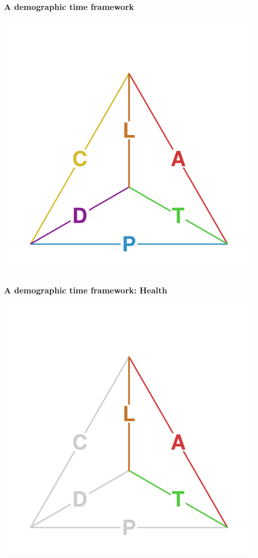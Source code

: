 \documentclass[20pt]{beamer}
\begin{document}
\begin{frame}
\frametitle{A demographic time framework}
\centering
\vspace{-3em}
\includegraphics[scale=1.5]{Figures/TetraHedronEdgesOnly.pdf}\\
\end{frame}

\begin{frame}
\frametitle{A demographic time framework: Health}
\centering
\vspace{-3em}
\includegraphics[scale=1.5]{Figures/TetraHedronEdgesOnlyTAL.pdf}\\
\end{frame}
\end{document}

